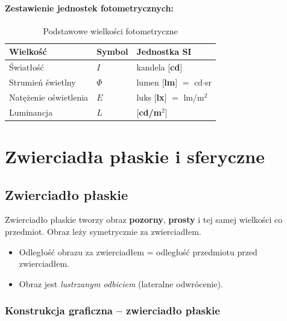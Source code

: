\documentclass[12pt,a4paper]{article}
\begin{document}
\paragraph{Zestawienie jednostek fotometrycznych:}

\begin{table}[H]
\centering
\renewcommand{\arraystretch}{1.4}
\begin{tabular}{lll}
\toprule
\textbf{Wielkość} & \textbf{Symbol} & \textbf{Jednostka SI} \\
\midrule
Światłość        & $I$      & kandela [\textbf{cd}]   \\
Strumień świetlny & $\Phi$  & lumen [\textbf{lm}] $=$ cd$\cdot$sr \\
Natężenie oświetlenia & $E$ & luks [\textbf{lx}] $=$ lm/m$^2$ \\
Luminancja       & $L$      & [\textbf{cd/m}$^2$]     \\
\bottomrule
\end{tabular}
\caption{Podstawowe wielkości fotometryczne}
\end{table}

\newpage
\section{Zwierciadła płaskie i sferyczne}

\subsection{Zwierciadło płaskie}

Zwierciadło płaskie tworzy obraz \textbf{pozorny}, \textbf{prosty} i tej samej
wielkości co przedmiot.  Obraz leży symetrycznie za zwierciadłem.

\begin{itemize}
  \item Odległość obrazu za zwierciadłem = odległość przedmiotu przed zwierciadłem.
  \item Obraz jest \emph{lustrzanym odbiciem} (lateralne odwrócenie).
\end{itemize}

\subsubsection{Konstrukcja graficzna -- zwierciadło płaskie}
\end{document}
